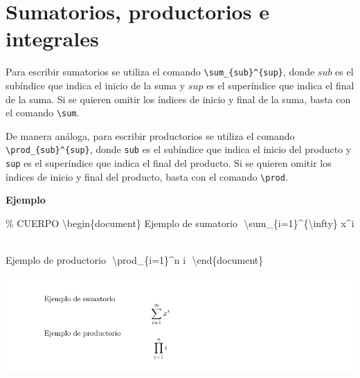 \documentclass[
  letterpaper,
  DIV=11,
  numbers=noendperiod]{scrreport}
\newenvironment{Shaded}{\begin{snugshade}}{\end{snugshade}}
\newcommand{\CommentTok}[1]{\textcolor[rgb]{0.37,0.37,0.37}{#1}}
\newcommand{\ExtensionTok}[1]{\textcolor[rgb]{0.00,0.23,0.31}{#1}}
\newcommand{\KeywordTok}[1]{\textcolor[rgb]{0.00,0.23,0.31}{#1}}
\newcommand{\NormalTok}[1]{\textcolor[rgb]{0.00,0.23,0.31}{#1}}
\newcommand{\SpecialCharTok}[1]{\textcolor[rgb]{0.37,0.37,0.37}{#1}}
\newcommand{\SpecialStringTok}[1]{\textcolor[rgb]{0.13,0.47,0.30}{#1}}
\begin{document}
\hypertarget{sumatorios-productorios-e-integrales}{%
\section{Sumatorios, productorios e
integrales}\label{sumatorios-productorios-e-integrales}}

Para escribir sumatorios se utiliza el comando
\texttt{\textbackslash{}sum\_\{sub\}\^{}\{sup\}}, donde \(sub\) es el
subíndice que indica el inicio de la suma y \(sup\) es el superíndice
que indica el final de la suma. Si se quieren omitir los índices de
inicio y final de la suma, basta con el comando
\texttt{\textbackslash{}sum}.

De manera análoga, para escribir productorios se utiliza el comando
\texttt{\textbackslash{}prod\_\{sub\}\^{}\{sup\}}, donde \texttt{sub} es
el subíndice que indica el inicio del producto y \texttt{sup} es el
superíndice que indica el final del producto. Si se quieren omitir los
índices de inicio y final del producto, basta con el comando
\texttt{\textbackslash{}prod}.

\textbf{Ejemplo}

\begin{Shaded}
\begin{Highlighting}[]
\CommentTok{\% CUERPO}
\KeywordTok{\textbackslash{}begin}\NormalTok{\{}\ExtensionTok{document}\NormalTok{\}}
\NormalTok{Ejemplo de sumatorio}
\SpecialStringTok{$$}
\SpecialCharTok{\textbackslash{}sum}\SpecialStringTok{\_\{i=1\}\^{}\{}\SpecialCharTok{\textbackslash{}infty}\SpecialStringTok{\} x\^{}i}
\SpecialStringTok{$$}

\NormalTok{Ejemplo de productorio}
\SpecialStringTok{$$}
\SpecialCharTok{\textbackslash{}prod}\SpecialStringTok{\_\{i=1\}\^{}n i}
\SpecialStringTok{$$}
\KeywordTok{\textbackslash{}end}\NormalTok{\{}\ExtensionTok{document}\NormalTok{\}}
\end{Highlighting}
\end{Shaded}

\begin{tcolorbox}[enhanced jigsaw, colback=white, colframe=quarto-callout-note-color-frame, title={Salida}, bottomtitle=1mm, colbacktitle=quarto-callout-note-color!10!white, bottomrule=.15mm, titlerule=0mm, opacityback=0, toptitle=1mm, arc=.35mm, left=2mm, rightrule=.15mm, toprule=.15mm, coltitle=black, leftrule=.75mm, opacitybacktitle=0.6, breakable]
\includegraphics{./img/formulas/sumatorio.png}
\end{tcolorbox}
\end{document}
